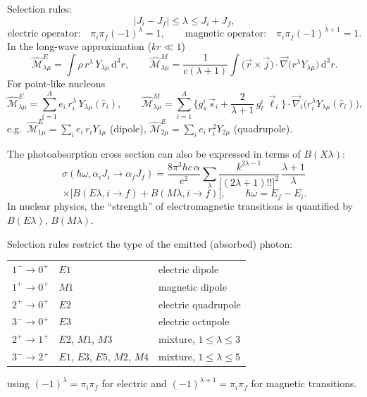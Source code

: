 \documentclass[11pt,a4paper]{article}
\newcommand{\op}[1]{\hat{#1}}
\newcommand{\ud}{\mathrm{d}}
\begin{document}
Selection rules:
\[
|J_i-J_f|\le\lambda\le J_i+J_f ,
\]
\[
\text{electric operator:}\quad \pi_i\pi_f(-1)^\lambda=1,\qquad
\text{magnetic operator:}\quad \pi_i\pi_f(-1)^{\lambda+1}=1 .
\]
In the long-wave approximation ($kr\ll1$)
\[
\op{\mathcal M}^E_{\lambda\mu}=\int\rho\,r^\lambda\,Y_{\lambda\mu}\,\ud^3r,
\qquad
\op{\mathcal M}^M_{\lambda\mu}=\frac{1}{c(\lambda+1)}\int\big(\vec r\times\vec j\big)\cdot\vec\nabla\big(r^\lambda Y_{\lambda\mu}\big)\,\ud^3r .
\]
For point-like nucleons
\[
\op{\mathcal M}^E_{\lambda\mu}=\sum_{i=1}^Ae_i\,r_i^\lambda\,Y_{\lambda\mu}(\hat r_i),
\qquad
\op{\mathcal M}^M_{\lambda\mu}=\sum_{i=1}^A\Big\{g_s^i\,\vec s_i+\frac{2}{\lambda+1}\,g_\ell^i\,\vec\ell_i\Big\}\cdot\vec\nabla_i\big(r_i^\lambda Y_{\lambda\mu}(\hat r_i)\big),
\]
e.g.\ $\op{\mathcal M}^E_{1\mu}=\sum_ie_i\,r_iY_{1\mu}$ (dipole), $\op{\mathcal M}^E_{2\mu}=\sum_ie_i\,r_i^2Y_{2\mu}$ (quadrupole).

The photoabsorption cross section can also be expressed in terms of $B(X\lambda)$:
\[
\sigma(\hbar\omega,\alpha_iJ_i\to\alpha_fJ_f)=\frac{8\pi^3\hbar c\,\alpha}{e^2}\sum_\lambda\frac{k^{2\lambda-1}}{\big[(2\lambda+1)!!\big]^2}\,\frac{\lambda+1}{\lambda}\,
\]
\[
\times\Big[B(E\lambda,i\to f)+B(M\lambda,i\to f)\Big],
\qquad \hbar\omega=E_f-E_i .
\]
In nuclear physics, the ``strength'' of electromagnetic transitions is quantified by $B(E\lambda)$, $B(M\lambda)$.

Selection rules restrict the type of the emitted (absorbed) photon:
\begin{center}
\begin{tabular}{l l l}
$1^-\to0^+$ & $E1$ & electric dipole\\
$1^+\to0^+$ & $M1$ & magnetic dipole\\
$2^+\to0^+$ & $E2$ & electric quadrupole\\
$3^-\to0^+$ & $E3$ & electric octupole\\
$2^+\to1^+$ & $E2$, $M1$, $M3$ & mixture, $1\le\lambda\le3$\\
$3^-\to2^+$ & $E1$, $E3$, $E5$, $M2$, $M4$ & mixture, $1\le\lambda\le5$
\end{tabular}
\end{center}
using $(-1)^\lambda=\pi_i\pi_f$ for electric and $(-1)^{\lambda+1}=\pi_i\pi_f$ for magnetic transitions.
\end{document}
